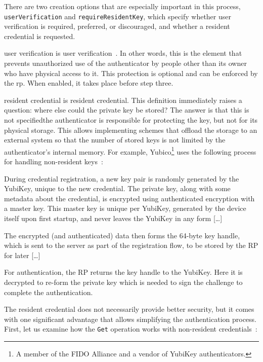 There are two creation options that are especially important in this process, \texttt{userVerification} and \texttt{requireResidentKey},
which specify whether \gls{user verification} is required, preferred, or discouraged, and whether a \gls{resident credential} is requested.

\Gls{user verification} is \glsdesc{user verification}~\cite{fido:webautn}. In other words, this is the element that prevents
unauthorized use of the authenticator by people other than its owner who have physical access to it.
This protection is optional and can be enforced by the \gls{rp}. When enabled, it takes place
before step three.

\Gls{resident credential} is \glsdesc{resident credential}. This definition immediately raises a question:
where else could the private key be stored? The answer is that this is not specified\textemdash the authenticator
is responsible for protecting the key, but not for its physical storage. This allows implementing schemes
that offload the storage to an external system so that the number of stored keys is not limited by the authenticator's
internal memory. For example, Yubico\footnote{A member of the FIDO Alliance and a vendor of YubiKey authenticators.} uses the following process for handling non-resident keys~\cite{yubico:key-generation}:

\begin{quoting}
	During credential registration, a new key pair is randomly generated by the YubiKey, unique to the new credential.
	The private key, along with some metadata about the credential, is encrypted using authenticated encryption with
	a master key. This master key is unique per YubiKey, generated by the device itself upon first startup,
	and never leaves the YubiKey in any form [\ldots]

	The encrypted (and authenticated) data then forms the 64-byte key handle, which is sent to the server as part of
	the registration flow, to be stored by the RP for later [\ldots]

	For authentication, the RP returns the key handle to the YubiKey. Here it is decrypted to re-form the private key
	which is needed to sign the challenge to complete the authentication.
\end{quoting}

The resident credential does not necessarily provide better security, but it comes with one significant advantage
that allows simplifying the authentication process. First, let us examine how the \texttt{Get} operation
works with non-resident credentials~\cite{fido:webautn}:

